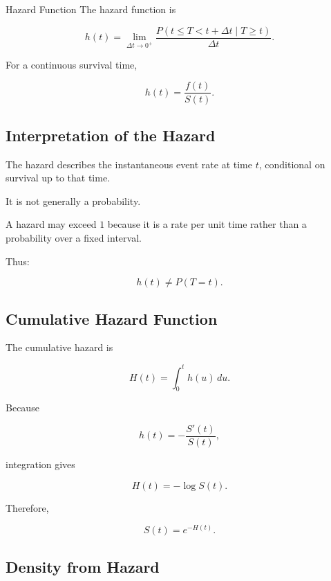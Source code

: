 \begin{definitionbox}{Hazard Function}
The hazard function is

\[
\boxed{
h(t)
=
\lim_{\Delta t\to0^+}
\frac{
P
(
t\leq T<t+\Delta t
\mid
T\geq t
)
}{
\Delta t
}.
}
\]
\end{definitionbox}

For a continuous survival time,

\[
\boxed{
h(t)
=
\frac{
f(t)
}{
S(t)
}.
}
\]

\subsection{Interpretation of the Hazard}
\label{subsec:hazard-interpretation}

The hazard describes the instantaneous event rate at time \(t\),
conditional on survival up to that time.

It is not generally a probability.

A hazard may exceed \(1\) because it is a rate per unit time rather than a
probability over a fixed interval.

Thus:

\[
\boxed{
h(t)
\neq
P(T=t).
}
\]

\subsection{Cumulative Hazard Function}
\label{subsec:cumulative-hazard}

The cumulative hazard is

\[
\boxed{
H(t)
=
\int_0^t
h(u)\,du.
}
\]

Because

\[
h(t)
=
-
\frac{
S'(t)
}{
S(t)
},
\]

integration gives

\[
\boxed{
H(t)
=
-
\log S(t).
}
\]

Therefore,

\[
\boxed{
S(t)
=
e^{-H(t)}.
}
\]

\subsection{Density from Hazard}
\label{subsec:density-from-hazard}

